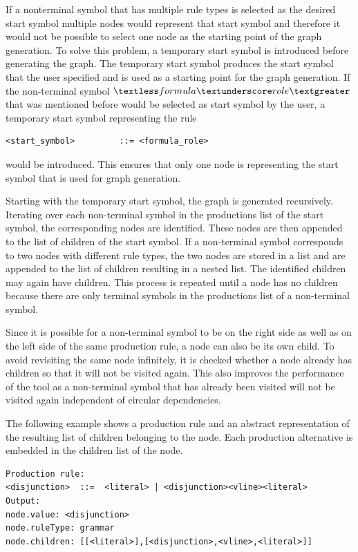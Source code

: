 If a nonterminal symbol that has multiple rule types is selected as the desired start symbol multiple nodes would represent that start symbol and therefore it would not be possible to select one node as the starting point of the graph generation.
To solve this problem, a temporary start symbol is introduced before generating the graph.
The temporary start symbol produces the start symbol that the user specified and is used as a starting point for the graph generation.
If the non-terminal symbol $\textless formula\textunderscore role\textgreater$ that was mentioned before would be selected as start symbol by the user, a temporary start symbol representing the rule
\begin{lstlisting}[caption= Rule of the temporary start symbol]
<start_symbol>         ::= <formula_role>
\end{lstlisting}
would be introduced.
This ensures that only one node is representing the start symbol that is used for graph generation.

Starting with the temporary start symbol, the graph is generated recursively. Iterating over each non-terminal symbol in the productions list of the start symbol, the corresponding nodes are identified. These nodes are then appended to the list of children of the start symbol. If a non-terminal symbol corresponds to two nodes with different rule types, the two nodes are stored in a list and are appended to the list of children resulting in a nested list. The identified children may again have children. This process is repeated until a node has no children because there are only terminal symbols in the productions list of a non-terminal symbol.

Since it is possible for a non-terminal symbol to be on the right side as well as on the left side of the same production rule, a node can also be its own child. To avoid revisiting the same node infinitely, it is checked whether a node already has children so that it will not be visited again. This also improves the performance of the tool as a non-terminal symbol that has already been visited will not be visited again independent of circular dependencies.

The following example shows a production rule and an abstract representation of the resulting list of children belonging to the node. Each production alternative is embedded in the children list of the node. %

\begin{lstlisting}[caption= Rule and resulting list of children]
Production rule:
<disjunction>  ::=  <literal> | <disjunction><vline><literal>
Output:
node.value: <disjunction>
node.ruleType: grammar
node.children: [[<literal>],[<disjunction>,<vline>,<literal>]]
\end{lstlisting}

